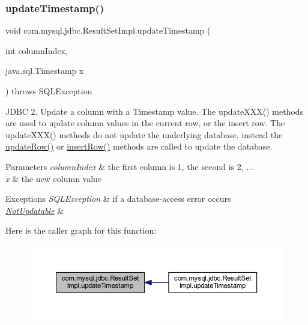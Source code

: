 \subsubsection{\texorpdfstring{update\+Timestamp()}{updateTimestamp()}\hspace{0.1cm}{\footnotesize\ttfamily [1/2]}}
{\footnotesize\ttfamily void com.\+mysql.\+jdbc.\+Result\+Set\+Impl.\+update\+Timestamp (\begin{DoxyParamCaption}\item[{int}]{column\+Index,  }\item[{java.\+sql.\+Timestamp}]{x }\end{DoxyParamCaption}) throws S\+Q\+L\+Exception}

J\+D\+BC 2. Update a column with a Timestamp value. The update\+X\+X\+X() methods are used to update column values in the current row, or the insert row. The update\+X\+X\+X() methods do not update the underlying database, instead the \mbox{\hyperlink{classcom_1_1mysql_1_1jdbc_1_1_result_set_impl_a2842d32292d023aaeeafedeed3322981}{update\+Row()}} or \mbox{\hyperlink{classcom_1_1mysql_1_1jdbc_1_1_result_set_impl_a78e304e3279cbcf60392f18c1385e3bf}{insert\+Row()}} methods are called to update the database.


\begin{DoxyParams}{Parameters}
{\em column\+Index} & the first column is 1, the second is 2, ... \\
\hline
{\em x} & the new column value\\
\hline
\end{DoxyParams}

\begin{DoxyExceptions}{Exceptions}
{\em S\+Q\+L\+Exception} & if a database-\/access error occurs \\
\hline
{\em \mbox{\hyperlink{classcom_1_1mysql_1_1jdbc_1_1_not_updatable}{Not\+Updatable}}} & \\
\hline
\end{DoxyExceptions}
Here is the caller graph for this function\+:
\nopagebreak
\begin{figure}[H]
\begin{center}
\leavevmode
\includegraphics[width=350pt]{classcom_1_1mysql_1_1jdbc_1_1_result_set_impl_a37a19594b5873238ea66b6549024e202_icgraph}
\end{center}
\end{figure}
\mbox{\label{classcom_1_1mysql_1_1jdbc_1_1_result_set_impl_a7934518ed2f8bbfee20a5b4a5a0cdcd0}} 
